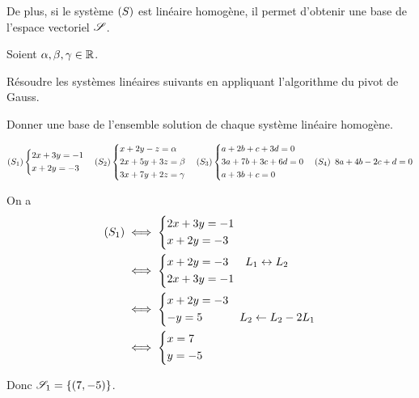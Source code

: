 De plus, si le système \(\left(S\right)\) est linéaire homogène, il permet d'obtenir une base de l'espace vectoriel \(\mathscr{S}\).

\begin{exoex}
Soient \(\alpha,\beta,\gamma\in\mathbb{R}\).

Résoudre les systèmes linéaires suivants en appliquant l'algorithme du pivot de Gauss.

Donner une base de l'ensemble solution de chaque système linéaire homogène.

\[\left(S_1\right)\begin{dcases}
2x+3y=-1 \\
x+2y=-3
\end{dcases}\quad\left(S_2\right)\begin{dcases}
x+2y-z=\alpha \\
2x+5y+3z=\beta \\
3x+7y+2z=\gamma
\end{dcases}\quad\left(S_3\right)\begin{dcases}
a+2b+c+3d=0 \\
3a+7b+3c+6d=0 \\
a+3b+c=0
\end{dcases}\quad\left(S_4\right)~8a+4b-2c+d=0\]
\end{exoex}

\begin{corr}[1]
On a \[\begin{aligned}
\left(S_1\right)&\iff\begin{dcases}
2x+3y=-1 \\
x+2y=-3
\end{dcases} \\
&\iff\begin{dcases}
x+2y=-3 &L_1\leftrightarrow L_2 \\
2x+3y=-1
\end{dcases} \\
&\iff\begin{dcases}
x+2y=-3 \\
-y=5 &L_2\gets L_2-2L_1
\end{dcases} \\
&\iff\begin{dcases}
x=7 \\
y=-5
\end{dcases}
\end{aligned}\]

Donc \(\mathscr{S}_1=\left\lbrace\left(7,-5\right)\right\rbrace\).
\end{corr}

